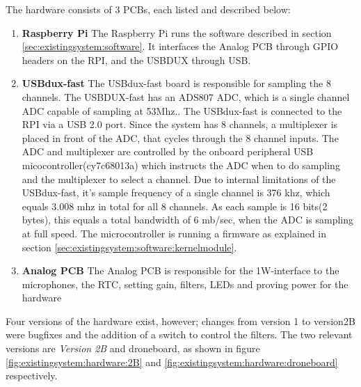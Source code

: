 The hardware consists of 3 PCBs, each listed and described below:
\begin{enumerate}
	\item \textbf{Raspberry Pi} The Raspberry Pi runs the software described in section \ref{sec:existingsystem:software}. It interfaces the Analog PCB through GPIO headers on the RPI, and the USBDUX through USB.
	
	\item \textbf{USBdux-fast} The USBdux-fast board is responsible for sampling the 8 channels. The USBDUX-fast has an ADS807 ADC, which is a single channel ADC capable of sampling at 53Mhz.\citep{ADC:ADS807}. The USBdux-fast is connected to the RPI via a USB 2.0 port.
Since the system has 8 channels, a multiplexer is placed in front of the ADC, that cycles through the 8 channel inputs.
The ADC and multiplexer are controlled by the onboard peripheral USB micocontroller(cy7c68013a) which instructs the ADC when to do sampling and the multiplexer to select a channel. Due to internal limitations of the USBdux-fast, it's sample frequency of a single channel is 376 khz, which equals 3.008 mhz in total for all 8 channels. As each sample is 16 bits(2 bytes), this equals a total bandwidth of 6 mb/sec, when the ADC is sampling at full speed. The microcontroller is running a firmware as explained in section \ref{sec:existingsystem:software:kernelmodule}.
	
	\item \textbf{Analog PCB} The Analog PCB is responsible for the 1W-interface to the microphones, the RTC, setting gain, filters, LEDs and proving power for the hardware
\end{enumerate}

Four versions of the hardware exist, however; changes from version 1 to version2B were bugfixes and the addition of a switch to control the filters. The two relevant versions are \textit{Version 2B} and droneboard, as shown in figure \ref{fig:existingsystem:hardware:2B} and \ref{fig:existingsystem:hardware:droneboard} respectively.

